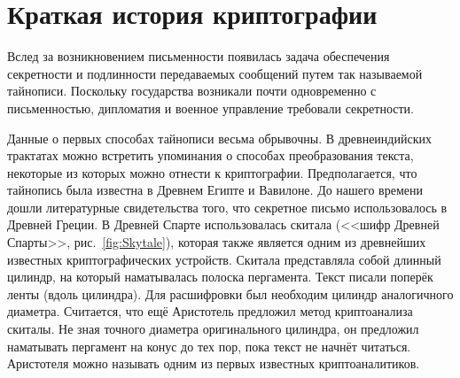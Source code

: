 \section{Краткая история криптографии}

Вслед за возникновением письменности появилась задача обеспечения секретности и подлинности передаваемых сообщений путем так называемой тайнописи. Поскольку государства возникали почти одновременно с письменностью, дипломатия и военное управление требовали секретности.

Данные о первых способах тайнописи весьма обрывочны. В древнеиндийских трактатах можно встретить упоминания о способах преобразования текста, некоторые из которых можно отнести к криптографии. Предполагается, что тайнопись была известна в Древнем Египте и Вавилоне. До нашего времени дошли литературные свидетельства того, что секретное письмо использовалось в Древней Греции. В Древней Спарте использовалась скитала (<<шифр Древней Спарты>>, рис.~\ref{fig:Skytale}), которая также является одним из древнейших известных криптографических устройств. Скитала представляла собой длинный цилиндр, на который наматывалась полоска пергамента. Текст писали поперёк ленты (вдоль цилиндра). Для расшифровки был необходим цилиндр аналогичного диаметра. Считается, что ещё Аристотель предложил метод криптоанализа скиталы. Не зная точного диаметра оригинального цилиндра, он предложил наматывать пергамент на конус до тех пор, пока текст не начнёт читаться. Аристотеля можно называть одним из первых известных криптоаналитиков.

